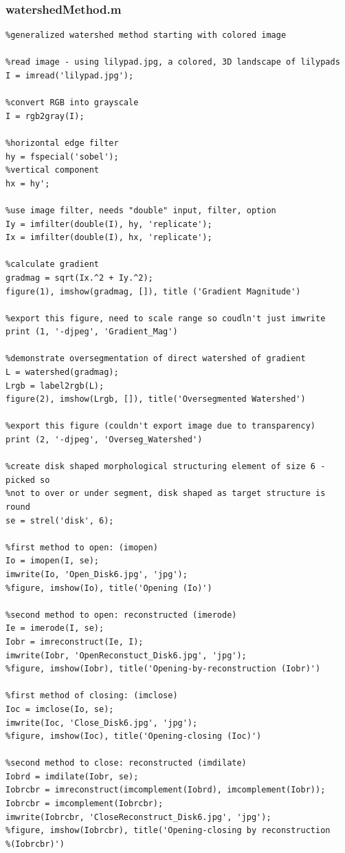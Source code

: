 \documentclass[12pt]{article}
\theoremstyle{plain}%
\theoremstyle{definition}
\theoremstyle{remark}
\begin{document}
\subsubsection{watershedMethod.m}
\begin{verbatim}
%generalized watershed method starting with colored image

%read image - using lilypad.jpg, a colored, 3D landscape of lilypads
I = imread('lilypad.jpg');

%convert RGB into grayscale
I = rgb2gray(I);

%horizontal edge filter
hy = fspecial('sobel');
%vertical component
hx = hy';

%use image filter, needs "double" input, filter, option
Iy = imfilter(double(I), hy, 'replicate');
Ix = imfilter(double(I), hx, 'replicate');

%calculate gradient
gradmag = sqrt(Ix.^2 + Iy.^2);
figure(1), imshow(gradmag, []), title ('Gradient Magnitude')

%export this figure, need to scale range so coudln't just imwrite
print (1, '-djpeg', 'Gradient_Mag')

%demonstrate oversegmentation of direct watershed of gradient
L = watershed(gradmag);
Lrgb = label2rgb(L);
figure(2), imshow(Lrgb, []), title('Oversegmented Watershed')

%export this figure (couldn't export image due to transparency)
print (2, '-djpeg', 'Overseg_Watershed')

%create disk shaped morphological structuring element of size 6 - picked so
%not to over or under segment, disk shaped as target structure is round
se = strel('disk', 6);

%first method to open: (imopen)
Io = imopen(I, se);
imwrite(Io, 'Open_Disk6.jpg', 'jpg');
%figure, imshow(Io), title('Opening (Io)')

%second method to open: reconstructed (imerode)
Ie = imerode(I, se);
Iobr = imreconstruct(Ie, I);
imwrite(Iobr, 'OpenReconstuct_Disk6.jpg', 'jpg');
%figure, imshow(Iobr), title('Opening-by-reconstruction (Iobr)')

%first method of closing: (imclose)
Ioc = imclose(Io, se);
imwrite(Ioc, 'Close_Disk6.jpg', 'jpg');
%figure, imshow(Ioc), title('Opening-closing (Ioc)')

%second method to close: reconstructed (imdilate)
Iobrd = imdilate(Iobr, se);
Iobrcbr = imreconstruct(imcomplement(Iobrd), imcomplement(Iobr));
Iobrcbr = imcomplement(Iobrcbr);
imwrite(Iobrcbr, 'CloseReconstruct_Disk6.jpg', 'jpg');
%figure, imshow(Iobrcbr), title('Opening-closing by reconstruction
%(Iobrcbr)')


\end{verbatim}
\end{document}
